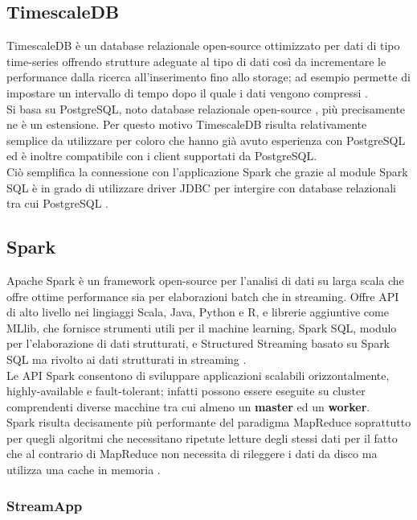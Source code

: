 \subsection{TimescaleDB}

TimescaleDB è un database relazionale open-source ottimizzato per dati di tipo time-series
offrendo strutture adeguate al tipo di dati così da incrementare le performance dalla ricerca
all'inserimento fino allo storage; ad esempio permette di impostare un intervallo di tempo
dopo il quale i dati vengono compressi \cite{timescale}.
\\
Si basa su PostgreSQL, noto database relazionale open-source \cite{postgresql}, più precisamente
ne è un estensione. Per questo motivo TimescaleDB risulta relativamente semplice da utilizzare
per coloro che hanno già avuto esperienza con PostgreSQL ed è inoltre compatibile con i client
supportati da PostgreSQL.
\\
Ciò semplifica la connessione con l'applicazione Spark che grazie al module Spark SQL è in grado
di utilizzare driver JDBC per intergire con database relazionali tra cui PostgreSQL
\cite{spark_sql}.

\subsection{Spark}

Apache Spark è un framework open-source per l'analisi di dati su larga scala che offre ottime
performance sia per elaborazioni batch che in streaming. Offre API di alto livello nei lingiaggi
Scala, Java, Python e R, e librerie aggiuntive come MLlib, che fornisce strumenti utili per il
machine learning, Spark SQL, modulo per l'elaborazione di dati strutturati,
e Structured Streaming basato su Spark SQL ma rivolto ai dati strutturati in streaming \cite{spark}.
\\
Le API Spark consentono di sviluppare applicazioni scalabili orizzontalmente, highly-available
e fault-tolerant; infatti possono
essere eseguite su cluster comprendenti diverse macchine tra cui almeno un \textbf{master} ed un
\textbf{worker}.
\\
Spark risulta decisamente più performante del paradigma MapReduce soprattutto per quegli algoritmi
che necessitano ripetute letture degli stessi dati per il fatto che al contrario di MapReduce non
necessita di rileggere i dati da disco ma utilizza una cache in memoria \cite{spark_mapred}.

\subsubsection{StreamApp}

